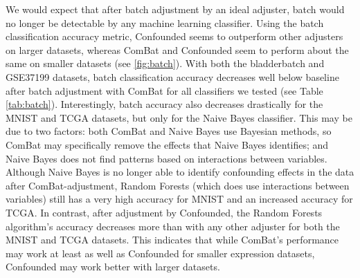 \documentclass[11pt]{article}
\begin{document}
We would expect that after batch adjustment by an ideal adjuster, batch would no longer be detectable by any machine learning classifier.
Using the batch classification accuracy metric, Confounded seems to outperform other adjusters on larger datasets, whereas ComBat and Confounded seem to perform about the same on smaller datasets (see \figurename{} \ref{fig:batch}).
With both the bladderbatch and GSE37199 datasets, batch classification accuracy decreases well below baseline after batch adjustment with ComBat for all classifiers we tested (see Table \ref{tab:batch}).
Interestingly, batch accuracy also decreases drastically for the MNIST and TCGA datasets, but only for the Naive Bayes classifier.
This may be due to two factors: both ComBat and Naive Bayes use Bayesian methods, so ComBat may specifically remove the effects that Naive Bayes identifies; and Naive Bayes does not find patterns based on interactions between variables.
Although Naive Bayes is no longer able to identify confounding effects in the data after ComBat-adjustment, Random Forests (which does use interactions between variables) still has a very high accuracy for MNIST and an increased accuracy for TCGA.
In contrast, after adjustment by Confounded, the Random Forests algorithm's accuracy decreases more than with any other adjuster for both the MNIST and TCGA datasets.
This indicates that while ComBat's performance may work at least as well as Confounded for smaller expression datasets, Confounded may work better with larger datasets.
\end{document}
